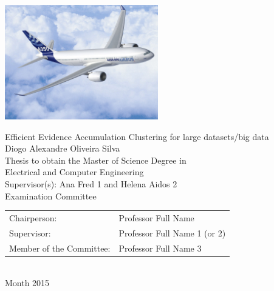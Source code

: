 \begin{center}
%
\vspace{2.5cm}
\includegraphics[height=50mm]{Figures/Airbus_A350.jpg}

\vspace{1.0cm}
{\FontLb Efficient Evidence Accumulation Clustering for large datasets/big data} \\
\vspace{2.7cm}
{\FontMb Diogo Alexandre Oliveira Silva} \\
\vspace{2.0cm}
{\FontSn Thesis to obtain the Master of Science Degree in} \\
\vspace{0.3cm}
{\FontLb Electrical and Computer Engineering} \\
\vspace{1.1cm}
{\FontSn Supervisor(s): Ana Fred 1 and Helena Aidos 2} \\
\vspace{1.1cm}
{\FontMb Examination Committee} \\
\vspace{0.3cm}
{\FontSn %
\begin{tabular}{ll}
Chairperson: & Professor Full Name \\
Supervisor: & Professor Full Name 1 (or 2) \\
Member of the Committee: & Professor Full Name 3
\end{tabular} } \\
\vspace{1.5cm}
{\FontMb Month 2015} \\
%
\end{center}

\cleardoublepage

